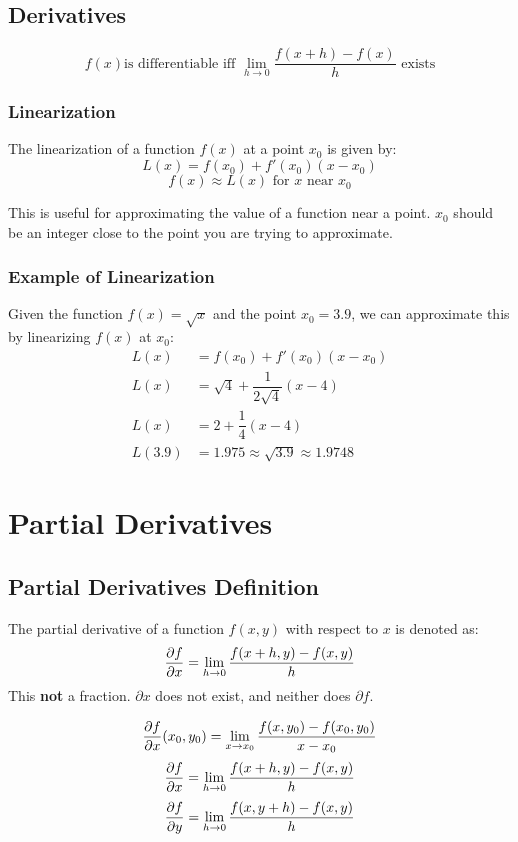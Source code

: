\subsection{Derivatives}

\[
    f(x) \text{is differentiable iff } \lim_{h \to 0} \dfrac{f(x+h) - f(x)}{h} \text{ exists}
\]
\subsubsection{Linearization}
The linearization of a function \(f(x)\) at a point \(x_0\) is given by:
\begin{equation}\label{Linearization}
    L(x) = f(x_0) + f'(x_0)(x-x_0)
\end{equation}
\[
    f(x) \approx L(x) \text{ for } x \text{ near } x_0
\]

This is useful for approximating the value of a function near a point. $x_0$ should be an integer close to the point you are trying to approximate.
\subsubsection{Example of Linearization}
Given the function \(f(x) = \sqrt{x}\) and the point \(x_0 = 3.9\), we can approximate this by linearizing \(f(x)\) at \(x_0\):
\begin{align*}
    L(x) &= f(x_0) + f'(x_0)(x-x_0)\\
    L(x) &= \sqrt{4} + \dfrac{1}{2\sqrt{4}}(x-4)\\
    L(x) &= 2 + \dfrac{1}{4}(x-4)\\
    L(3.9) &= 1.975 \approx \sqrt{3.9} \approx 1.9748    
\end{align*}

\section{Partial Derivatives}
\subsection{Partial Derivatives Definition}

The partial derivative of a function \(f(x, y)\) with respect to \(x\) is denoted as:
\[
    \dfrac{\partial f}{\partial x} = \lim_{h \to 0} \dfrac{f(x+h, y) - f(x, y)}{h}
\]
This \textbf{not} a fraction. $\partial x$ does not exist, and neither does $\partial f$.

\begin{equation}\label{Partial Derivative at a Point Definition}
    \dfrac{\partial f}{\partial x}(x_0, y_0) = 
    \lim_{x \to x_0} \dfrac{f(x, y_0) - f(x_0, y_0)}{x-x_0}
\end{equation}
\begin{equation}\label{Partial Derivative delfdelx Definition}
    \dfrac{\partial f}{\partial x} = \lim_{h \to 0} \dfrac{f(x+h, y) - f(x, y)}{h}
\end{equation}
\begin{equation}\label{Partial Derivative delfdely Definition}
    \dfrac{\partial f}{\partial y} = \lim_{h \to 0} \dfrac{f(x, y+h) - f(x, y)}{h}
\end{equation}

